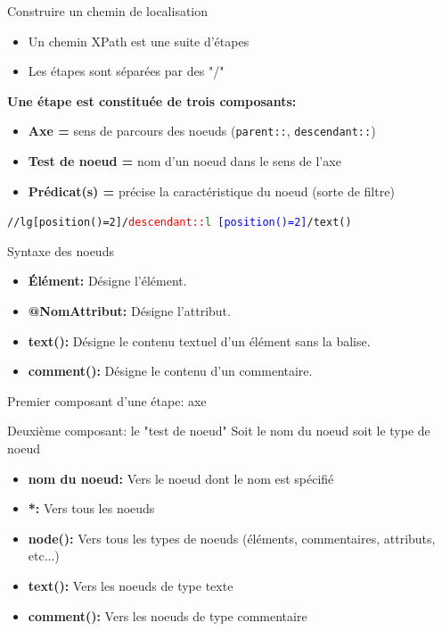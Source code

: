 \begin{frame}{Construire un chemin de localisation}
    \begin{itemize}
        \item Un chemin XPath est une suite d'étapes
        \item Les étapes sont séparées par des "/"
    \end{itemize}
    \textbf{Une étape est constituée de trois composants:}
    \begin{itemize}
        \item \textbf{Axe =} sens de parcours des noeuds (\texttt{parent::}, \texttt{descendant::})
        \item \textbf{Test de noeud =} nom d'un noeud dans le sens de l'axe
        \item \textbf{Prédicat(s) =} précise la caractéristique du noeud (sorte de filtre)
    \end{itemize}
    \texttt{//lg[position()=2]/\textcolor{red}{descendant::}\textcolor{green}{l} \textcolor{blue}{[position()=2]}/text()}
\end{frame}

\begin{frame}{Syntaxe des noeuds}
    \begin{itemize}
        \item \textbf{Élément:} Désigne l'élément.
        \item \textbf{@NomAttribut:} Désigne l'attribut.
        \item \textbf{text():} Désigne le contenu textuel d'un élément sans la balise.
        \item \textbf{comment():} Désigne le contenu d'un commentaire.
    \end{itemize}
\end{frame}

\begin{frame}{Premier composant d'une étape: axe}
            
\end{frame}

\begin{frame}{Deuxième composant: le "test de noeud"}
    \textrightarrow{} Soit le nom du noeud soit le type de noeud
    \begin{itemize}
        \item \textbf{nom du noeud:} Vers le noeud dont le nom est spécifié
        \item \textbf{*:} Vers tous les noeuds
        \item \textbf{node():} Vers tous les types de noeuds (éléments, commentaires, attributs, etc...)
        \item \textbf{text():} Vers les noeuds de type texte
        \item \textbf{comment():} Vers les noeuds de type commentaire
    \end{itemize}
\end{frame}

